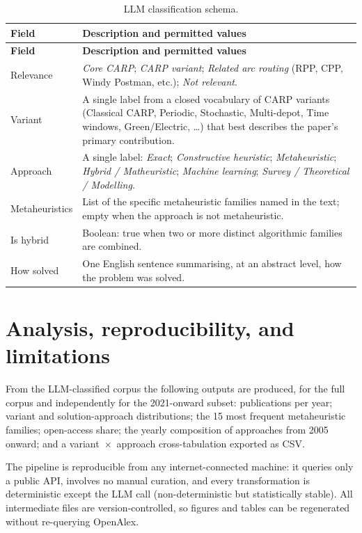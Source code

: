 \documentclass[11pt]{article}
\begin{document}
{\small
\begin{longtable}{@{}p{3.4cm}p{10.2cm}@{}}
\caption{LLM classification schema.}\label{tab:schema}\\
\toprule
\textbf{Field} & \textbf{Description and permitted values} \\
\midrule
\endfirsthead
\toprule
\textbf{Field} & \textbf{Description and permitted values} \\
\midrule
\endhead
Relevance &
  \emph{Core CARP}; \emph{CARP variant}; \emph{Related arc routing} (RPP, CPP,
  Windy Postman, etc.); \emph{Not relevant}. \\
Variant &
  A single label from a closed vocabulary of CARP variants (Classical CARP,
  Periodic, Stochastic, Multi-depot, Time windows, Green/Electric, \ldots) that best
  describes the paper's primary contribution. \\
Approach &
  A single label: \emph{Exact}; \emph{Constructive heuristic}; \emph{Metaheuristic};
  \emph{Hybrid / Matheuristic}; \emph{Machine learning};
  \emph{Survey / Theoretical / Modelling}. \\
Metaheuristics &
  List of the specific metaheuristic families named in the text; empty when the
  approach is not metaheuristic. \\
Is hybrid &
  Boolean: true when two or more distinct algorithmic families are combined. \\
How solved &
  One English sentence summarising, at an abstract level, how the problem was
  solved. \\
\bottomrule
\end{longtable}
}

\section{Analysis, reproducibility, and limitations}

From the LLM-classified corpus the following outputs are produced, for the full
corpus and independently for the 2021-onward subset: publications per year; variant
and solution-approach distributions; the 15 most frequent metaheuristic families;
open-access share; the yearly composition of approaches from 2005 onward; and a
variant~$\times$~approach cross-tabulation exported as CSV.

The pipeline is reproducible from any internet-connected machine: it queries only a
public API, involves no manual curation, and every transformation is deterministic
except the LLM call (non-deterministic but statistically stable). All intermediate
files are version-controlled, so figures and tables can be regenerated without
re-querying OpenAlex.
\end{document}
